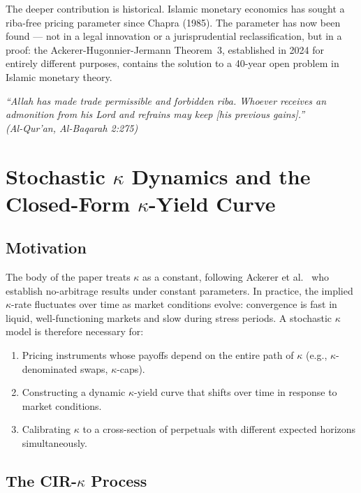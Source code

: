 \documentclass[10pt,twocolumn]{article}
\theoremstyle{plain}
\theoremstyle{definition}
\begin{document}
The deeper contribution is historical. Islamic monetary economics
has sought a riba-free pricing parameter since Chapra (1985).
The parameter has now been found --- not in a legal innovation
or a jurisprudential reclassification, but in a proof: the
Ackerer-Hugonnier-Jermann Theorem~3, established in 2024 for
entirely different purposes, contains the solution to a 40-year
open problem in Islamic monetary theory.

\bigskip
\noindent\textit{``Allah has made trade permissible and forbidden
\textit{riba}. Whoever receives an admonition from his Lord and
refrains may keep [his previous gains].''}\\
\textit{(Al-Qur'an, Al-Baqarah 2:275)}

\appendix

\section{Stochastic $\kappa$ Dynamics and the Closed-Form
$\kappa$-Yield Curve}
\label{app:stochastic_kappa}

\subsection{Motivation}

The body of the paper treats $\kappa$ as a constant, following
Ackerer et al.\ \cite{Ackerer2024} who establish no-arbitrage
results under constant parameters. In practice, the implied
$\kappa$-rate fluctuates over time as market conditions evolve:
convergence is fast in liquid, well-functioning markets and slow
during stress periods. A stochastic $\kappa$ model is therefore
necessary for:
\begin{enumerate}[leftmargin=*,noitemsep]
\item Pricing instruments whose payoffs depend on the entire
path of $\kappa$ (e.g., $\kappa$-denominated swaps, $\kappa$-caps).
\item Constructing a dynamic $\kappa$-yield curve that shifts
over time in response to market conditions.
\item Calibrating $\kappa$ to a cross-section of perpetuals with
different expected horizons simultaneously.
\end{enumerate}

\subsection{The CIR-$\kappa$ Process}
\end{document}
